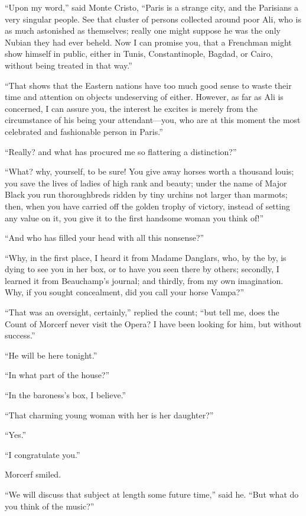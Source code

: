 “Upon my word,” said Monte Cristo, “Paris is a strange city, and the
Parisians a very singular people. See that cluster of persons collected
around poor Ali, who is as much astonished as themselves; really one
might suppose he was the only Nubian they had ever beheld. Now I can
promise you, that a Frenchman might show himself in public, either in
Tunis, Constantinople, Bagdad, or Cairo, without being treated in that
way.”

“That shows that the Eastern nations have too much good sense to waste
their time and attention on objects undeserving of either. However, as
far as Ali is concerned, I can assure you, the interest he excites is
merely from the circumstance of his being your attendant—you, who are
at this moment the most celebrated and fashionable person in Paris.”

“Really? and what has procured me so flattering a distinction?”

“What? why, yourself, to be sure! You give away horses worth a thousand
louis; you save the lives of ladies of high rank and beauty; under the
name of Major Black you run thoroughbreds ridden by tiny urchins not
larger than marmots; then, when you have carried off the golden trophy
of victory, instead of setting any value on it, you give it to the
first handsome woman you think of!”

“And who has filled your head with all this nonsense?”

“Why, in the first place, I heard it from Madame Danglars, who, by the
by, is dying to see you in her box, or to have you seen there by
others; secondly, I learned it from Beauchamp’s journal; and thirdly,
from my own imagination. Why, if you sought concealment, did you call
your horse Vampa?”

“That was an oversight, certainly,” replied the count; “but tell me,
does the Count of Morcerf never visit the Opera? I have been looking
for him, but without success.”

“He will be here tonight.”

“In what part of the house?”

“In the baroness’s box, I believe.”

“That charming young woman with her is her daughter?”

“Yes.”

“I congratulate you.”

Morcerf smiled.

“We will discuss that subject at length some future time,” said he.
“But what do you think of the music?”

